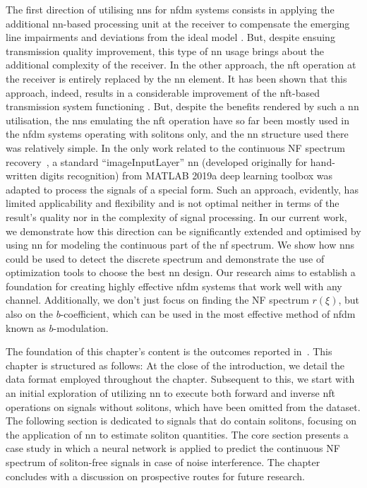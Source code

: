 The first direction of utilising \acrshort{nn}s for \acrshort{nfdm} systems consists in applying the additional \acrshort{nn}-based processing unit at the receiver to compensate the emerging line impairments and deviations from the ideal model \cite{gdd18,kwp19,kkp19,kpk20,kkp21}. But, despite ensuing transmission quality improvement, this type of \acrshort{nn} usage brings about the additional complexity of the receiver. In the other approach, the \acrshort{nft} operation at the receiver is entirely replaced by the \acrshort{nn} element. It has been shown that this approach, indeed, results in a considerable improvement of the \acrshort{nft}-based transmission system functioning \cite{ymm19,jgy18,wxz20}. But, despite the benefits rendered by such a \acrshort{nn} utilisation, the \acrshort{nn}s emulating the \acrshort{nft} operation have so far been mostly used in the \acrshort{nfdm} systems operating with solitons only, and the \acrshort{nn} structure used there was relatively simple.  In the only work related to the continuous NF spectrum recovery~\cite{zhang2021direct}, a standard ``imageInputLayer'' \acrshort{nn} (developed originally for hand-written digits recognition) from MATLAB 2019a deep learning toolbox was adapted to process the signals of a special form. Such an approach, evidently, has limited applicability and flexibility and is not optimal neither in terms of the result's quality nor in the complexity of signal processing. 
In our current work, we demonstrate how this direction can be significantly extended and optimised by using \acrfull{nn} for modeling the continuous part of the \acrfull{nf} spectrum. We show how \acrshort{nn}s could be used to detect the discrete spectrum and demonstrate the use of optimization tools to choose the best \acrshort{nn} design. Our research aims to establish a foundation for creating highly effective \acrshort{nfdm} systems that work well with any channel. Additionally, we don't just focus on finding the NF spectrum \( r(\xi) \), but also on the \( b \)-coefficient, which can be used in the most effective method of \acrshort{nfdm} known as \( b \)-modulation.


The foundation of this chapter's content is the outcomes reported in~\cite{sedov2020application, sedov2021neural, sedov2021direct}. This chapter is structured as follows: At the close of the introduction, we detail the data format employed throughout the chapter. Subsequent to this, we start with an initial exploration of utilizing \acrfull{nn} to execute both forward and inverse \acrfull{nft} operations on signals without solitons, which have been omitted from the dataset. The following section is dedicated to signals that do contain solitons, focusing on the application of \acrshort{nn} to estimate soliton quantities. The core section presents a case study in which a neural network is applied to predict the continuous NF spectrum of soliton-free signals in case of noise interference. The chapter concludes with a discussion on prospective routes for future research.



